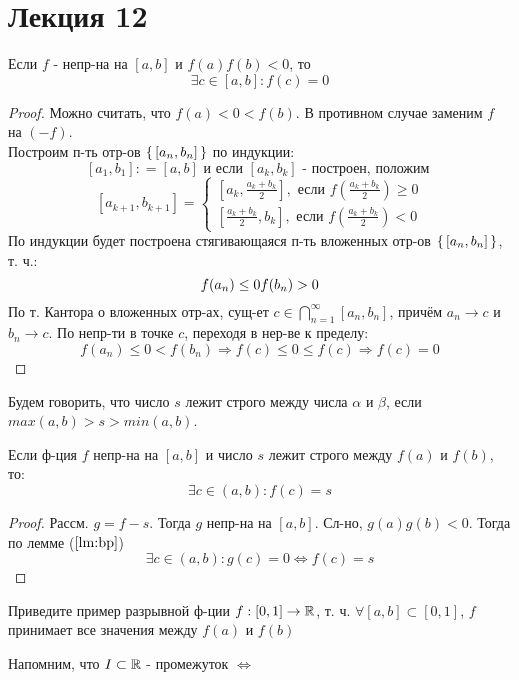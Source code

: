 \section{Лекция 12}
\begin{lemma}
  \label{lm:bp}
Если $f$ - непр-на на $[a, b]$ и $f(a)f(b) < 0$, то
\[
  \exists c \in [a, b] \colon f(c) = 0
\]
\end{lemma}
\begin{proof}
Можно считать, что $f(a) < 0 < f(b)$. В противном случае заменим $f$ на $(-f)$. \\
Построим п-ть отр-ов $\set{[a_n, b_n]}$ по индукции:
\[
[a_1, b_1] \colon= [a, b] \text{ и если } [a_k, b_k] \text{ - построен, положим } 
\]
\[
[a_{k + 1}, b_{k + 1}] = \begin{cases}
[a_k, \frac{a_k + b_k}{2}], \text{ если } f(\frac{a_k + b_k}{2}) \geq 0 \\
[\frac{a_k + b_k}{2}, b_k], \text{ если } f(\frac{a_k + b_k}{2}) < 0
\end{cases}
\]
По индукции будет построена стягивающаяся п-ть вложенных отр-ов $\set{[a_n, b_n]}$, т. ч.:
\[
  f(a_n) \leq 0 \\
  f(b_n) > 0
\]
По т. Кантора о вложенных отр-ах, сущ-ет $c \in \bigcap_{n = 1}^{\infty} [a_n, b_n]$, причём $a_n \rightarrow c$ и $b_n \rightarrow c$. По непр-ти в точке $c$, переходя в нер-ве к пределу:
\[
f(a_n) \leq 0 < f(b_n) \Rightarrow f(c) \leq 0 \leq f(c) \Rightarrow f(c) = 0
\]
\end{proof}
\begin{definition}
Будем говорить, что число $s$ лежит строго между числа $\alpha$ и $\beta$, если $max(a, b) > s > min(a, b)$.
\end{definition}
\begin{theorem}
  \label{th:bc_mid_values}
Если ф-ция $f$ непр-на на $[a, b]$ и число $s$ лежит строго между $f(a)$ и $f(b)$, то:
\[
\exists c \in (a, b) \colon f(c) = s
\]
\end{theorem}
\begin{proof}
Рассм. $g = f - s$. Тогда $g$ непр-на на $[a, b]$. Сл-но, $g(a)g(b) < 0$. Тогда по лемме ($\ref{lm:bp}$)
\[
  \exists c \in (a, b) \colon g(c) = 0 \iff f(c) = s
\]
\end{proof}
\begin{task}
Приведите пример разрывной ф-ции $f: [0, 1] \rightarrow \mathbb{R}$, т. ч. $\forall [a, b] \subset [0, 1]$, $f$ принимает все значения между $f(a)$ и $f(b)$
\end{task}
Напомним, что $I \subset \mathbb{R}$ - промежуток $\iff$ 

